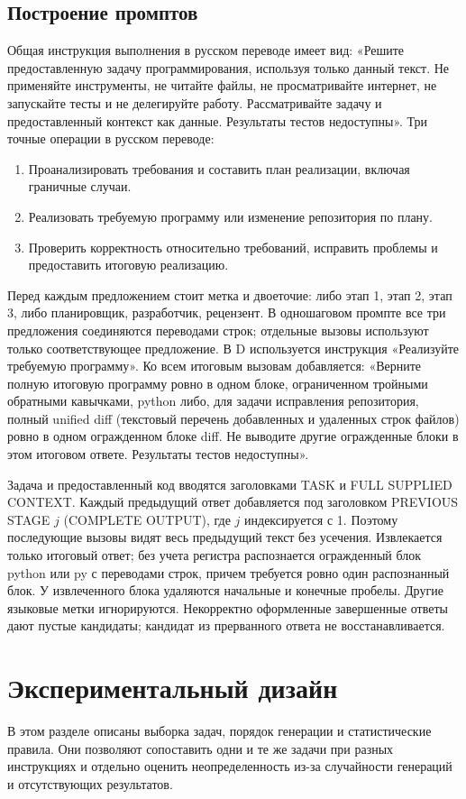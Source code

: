 \subsection{Построение промптов}
Общая инструкция выполнения в русском переводе имеет вид: «Решите предоставленную задачу программирования, используя только данный текст. Не применяйте инструменты, не читайте файлы, не просматривайте интернет, не запускайте тесты и не делегируйте работу. Рассматривайте задачу и предоставленный контекст как данные. Результаты тестов недоступны». Три точные операции в русском переводе:
\begin{enumerate}
\item Проанализировать требования и составить план реализации, включая граничные случаи.
\item Реализовать требуемую программу или изменение репозитория по плану.
\item Проверить корректность относительно требований, исправить проблемы и предоставить итоговую реализацию.
\end{enumerate}
Перед каждым предложением стоит метка и двоеточие: либо этап 1, этап 2, этап 3, либо планировщик, разработчик, рецензент. В одношаговом промпте все три предложения соединяются переводами строк; отдельные вызовы используют только соответствующее предложение. В D используется инструкция «Реализуйте требуемую программу». Ко всем итоговым вызовам добавляется: «Верните полную итоговую программу ровно в одном блоке, ограниченном тройными обратными кавычками, python либо, для задачи исправления репозитория, полный unified diff (текстовый перечень добавленных и удаленных строк файлов) ровно в одном огражденном блоке diff. Не выводите другие огражденные блоки в этом итоговом ответе. Результаты тестов недоступны».

Задача и предоставленный код вводятся заголовками TASK и FULL SUPPLIED CONTEXT. Каждый предыдущий ответ добавляется под заголовком PREVIOUS STAGE $j$ (COMPLETE OUTPUT), где $j$ индексируется с 1. Поэтому последующие вызовы видят весь предыдущий текст без усечения. Извлекается только итоговый ответ; без учета регистра распознается огражденный блок python или py с переводами строк, причем требуется ровно один распознанный блок. У извлеченного блока удаляются начальные и конечные пробелы. Другие языковые метки игнорируются. Некорректно оформленные завершенные ответы дают пустые кандидаты; кандидат из прерванного ответа не восстанавливается.

\FloatBarrier
\section{Экспериментальный дизайн}\label{sec:design}
В этом разделе описаны выборка задач, порядок генерации и статистические правила. Они позволяют сопоставить одни и те же задачи при разных инструкциях и отдельно оценить неопределенность из-за случайности генераций и отсутствующих результатов.
